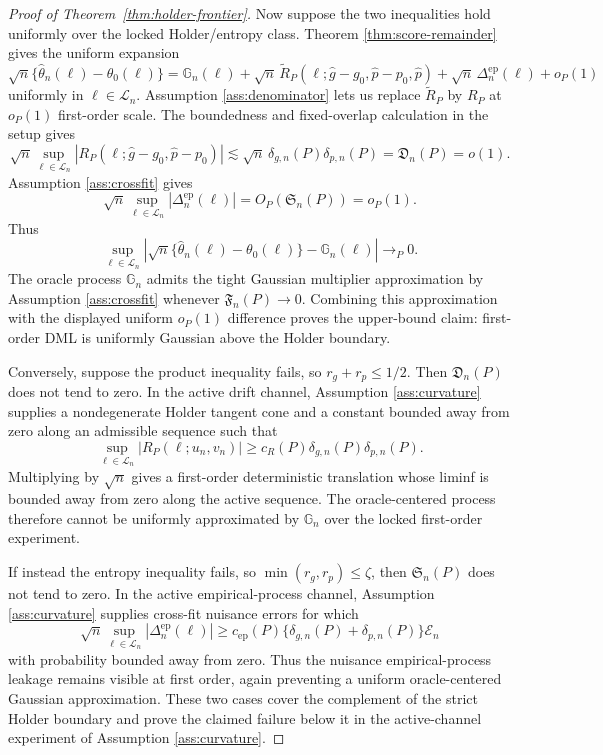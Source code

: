 \begin{proof}[Proof of Theorem~\ref{thm:holder-frontier}]
Now suppose the two inequalities hold uniformly over the locked
Holder/entropy class.  Theorem \ref{thm:score-remainder} gives the uniform
expansion
\[
\sqrt n\{\hat\theta_n(\ell)-\theta_0(\ell)\}
=\mathbb G_n(\ell)
+\sqrt n\,\widetilde R_P(\ell;\hat g-g_0,\hat p-p_0,\hat p)
+\sqrt n\,\Delta_n^{\mathrm{ep}}(\ell)+o_P(1)
\]
uniformly in \(\ell\in\mathcal L_n\).  Assumption \ref{ass:denominator} lets
us replace \(\widetilde R_P\) by \(R_P\) at \(o_P(1)\) first-order scale.  The
boundedness and fixed-overlap calculation in the setup gives
\[
\sqrt n\sup_{\ell\in\mathcal L_n}|R_P(\ell;\hat g-g_0,\hat p-p_0)|
\lesssim
\sqrt n\,\delta_{g,n}(P)\delta_{p,n}(P)
=\mathfrak D_n(P)=o(1).
\]
Assumption \ref{ass:crossfit} gives
\[
\sqrt n\sup_{\ell\in\mathcal L_n}|\Delta_n^{\mathrm{ep}}(\ell)|
=O_P(\mathfrak S_n(P))=o_P(1).
\]
Thus
\[
\sup_{\ell\in\mathcal L_n}
\left|
\sqrt n\{\hat\theta_n(\ell)-\theta_0(\ell)\}-\mathbb G_n(\ell)
\right|
\to_P0.
\]
The oracle process \(\mathbb G_n\) admits the tight Gaussian multiplier
approximation by Assumption \ref{ass:crossfit} whenever
\(\mathfrak F_n(P)\to0\).  Combining this approximation with the displayed
uniform \(o_P(1)\) difference proves the upper-bound claim: first-order DML is
uniformly Gaussian above the Holder boundary.

Conversely, suppose the product inequality fails, so \(r_g+r_p\le1/2\).  Then
\(\mathfrak D_n(P)\) does not tend to zero.  In the active drift channel,
Assumption \ref{ass:curvature} supplies a nondegenerate Holder tangent cone
and a constant bounded away from zero along an admissible sequence such that
\[
\sup_{\ell\in\mathcal L_n}|R_P(\ell;u_n,v_n)|
\ge c_R(P)\delta_{g,n}(P)\delta_{p,n}(P).
\]
Multiplying by \(\sqrt n\) gives a first-order deterministic translation whose
liminf is bounded away from zero along the active sequence.  The oracle-centered
process therefore cannot be uniformly approximated by \(\mathbb G_n\) over the
locked first-order experiment.

If instead the entropy inequality fails, so \(\min(r_g,r_p)\le\zeta\), then
\(\mathfrak S_n(P)\) does not tend to zero.  In the active empirical-process
channel, Assumption \ref{ass:curvature} supplies cross-fit nuisance errors for
which
\[
\sqrt n\sup_{\ell\in\mathcal L_n}|\Delta_n^{\mathrm{ep}}(\ell)|
\ge
c_{\mathrm{ep}}(P)\{\delta_{g,n}(P)+\delta_{p,n}(P)\}\mathcal{E}_n
\]
with probability bounded away from zero.  Thus the nuisance empirical-process
leakage remains visible at first order, again preventing a uniform
oracle-centered Gaussian approximation.  These two cases cover the complement
of the strict Holder boundary and prove the claimed failure below it in the
active-channel experiment of Assumption \ref{ass:curvature}.
\end{proof}

